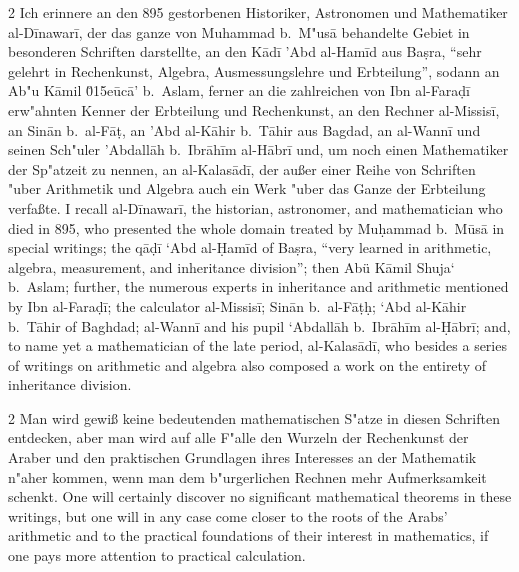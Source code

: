 \documentclass[10pt,a4paper]{article}
\renewcommand{\switchcolumn}{\syncronize\nointerlineskip\columnbreak}
\newcommand{\enquote}[1]{``#1''}
\begin{document}
\begin{paracol}{2}
Ich erinnere an den 895 gestorbenen Historiker, Astronomen und Mathematiker al-D\={i}nawar\={i}, der das ganze von Muhammad b.\ M"us\=a behandelte Gebiet in besonderen Schriften darstellte, an den K\=ad\={i} 'Abd al-Ham\={i}d aus Ba\d{s}ra, \enquote{sehr gelehrt in Rechenkunst, Algebra, Ausmessungslehre und Erbteilung}, sodann an Ab"u K\=amil \u015e\=uc\=a' b.\ Aslam, ferner an die zahlreichen von Ibn al-Fara\d{d}\={i} erw"ahnten Kenner der Erbteilung und Rechenkunst, an den Rechner al-Missis\={i}, an Sin\=an b.\ al-F\=a\d{t}, an 'Abd al-K\=ahir b.\ T\=ahir aus Bagdad, an al-Wann\={i} und seinen Sch"uler 'Abdall\=ah b.\ Ibr\=ah\={i}m al-H\=abr\={i} und, um noch einen Mathematiker der Sp"atzeit zu nennen, an al-Kalas\=ad\={i}, der au\ss{}er einer Reihe von Schriften "uber Arithmetik und Algebra auch ein Werk "uber das Ganze der Erbteilung verfa\ss{}te.
\switchcolumn
I recall al-D\={i}nawar\={i}, the historian, astronomer, and mathematician who died in 895, who presented the whole domain treated by Mu\d{h}ammad b.\ M\=us\=a in special writings; the q\=a\d{d}\={i} `Abd al-\d{H}am\={i}d of Ba\d{s}ra, ``very learned in arithmetic, algebra, measurement, and inheritance division''; then Ab\"u K\=amil Shuja` b.\ Aslam; further, the numerous experts in inheritance and arithmetic mentioned by Ibn al-Fara\d{d}\={i}; the calculator al-Missis\={i}; Sin\=an b.\ al-F\=a\d{t}\d{h}; `Abd al-K\=ahir b.\ T\=ahir of Baghdad; al-Wann\={i} and his pupil `Abdall\=ah b.\ Ibr\=ah\={i}m al-\d{H}\=abr\={i}; and, to name yet a mathematician of the late period, al-Kalas\=ad\={i}, who besides a series of writings on arithmetic and algebra also composed a work on the entirety of inheritance division.
\end{paracol}

\begin{paracol}{2}
Man wird gewi\ss{} keine bedeutenden mathematischen S"atze in diesen Schriften entdecken, aber man wird auf alle F"alle den Wurzeln der Rechenkunst der Araber und den praktischen Grundlagen ihres Interesses an der Mathematik n"aher kommen, wenn man dem b"urgerlichen Rechnen mehr Aufmerksamkeit schenkt.
\switchcolumn
One will certainly discover no significant mathematical theorems in these writings, but one will in any case come closer to the roots of the Arabs' arithmetic and to the practical foundations of their interest in mathematics, if one pays more attention to practical calculation.
\end{paracol}
\end{document}
